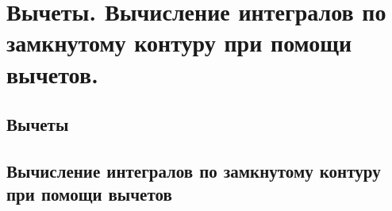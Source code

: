 \chapter{Вычеты. Вычисление интегралов по замкнутому контуру при помощи вычетов.}
\section{Вычеты}
\section{Вычисление интегралов по замкнутому контуру при помощи вычетов}